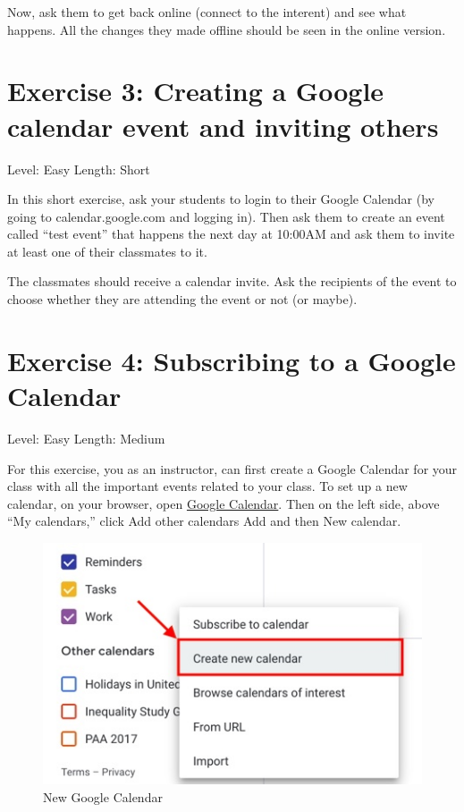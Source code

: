 \documentclass[]{book}
\begin{document}
Now, ask them to get back online (connect to the interent) and see what happens. All the changes they made offline should be seen in the online version.

\hypertarget{exercise-3-creating-a-google-calendar-event-and-inviting-others}{%
\section*{Exercise 3: Creating a Google calendar event and inviting others}\label{exercise-3-creating-a-google-calendar-event-and-inviting-others}}

Level: Easy
Length: Short

In this short exercise, ask your students to login to their Google Calendar (by going to calendar.google.com and logging in). Then ask them to create an event called ``test event'' that happens the next day at 10:00AM and ask them to invite at least one of their classmates to it.

The classmates should receive a calendar invite. Ask the recipients of the event to choose whether they are attending the event or not (or maybe).

\hypertarget{exercise-4-subscribing-to-a-google-calendar}{%
\section*{Exercise 4: Subscribing to a Google Calendar}\label{exercise-4-subscribing-to-a-google-calendar}}

Level: Easy
Length: Medium

For this exercise, you as an instructor, can first create a Google Calendar for your class with all the important events related to your class. To set up a new calendar, on your browser, open \href{https://calendar.google.com}{Google Calendar}. Then on the left side, above ``My calendars,'' click Add other calendars Add and then New calendar.

\begin{figure}
\centering
\includegraphics{./images/new_gcalendar.jpg}
\caption{New Google Calendar}
\end{figure}
\end{document}
